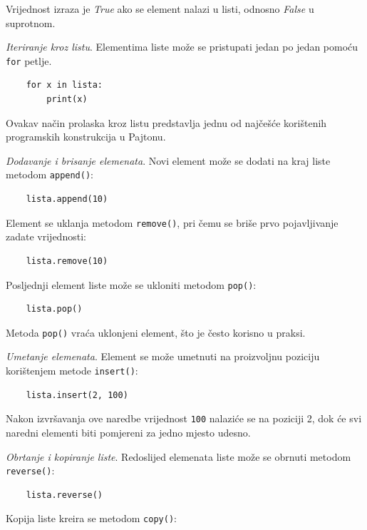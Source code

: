 Vrijednost izraza je \emph{True} ako se element nalazi u listi, odnosno \emph{False} u suprotnom.

\textit{Iteriranje kroz listu}. Elementima liste može se pristupati jedan po jedan pomoću \texttt{for} petlje.

\begin{verbatim}
	for x in lista:
	    print(x)
\end{verbatim}

Ovakav način prolaska kroz listu predstavlja jednu od najčešće korištenih programskih konstrukcija u Pajtonu.

\textit{Dodavanje i brisanje elemenata}. Novi element može se dodati na kraj liste metodom \texttt{append()}:

\begin{verbatim}
	lista.append(10)
\end{verbatim}

Element se uklanja metodom \texttt{remove()}, pri čemu se briše prvo pojavljivanje zadate vrijednosti:

\begin{verbatim}
	lista.remove(10)
\end{verbatim}

Posljednji element liste može se ukloniti metodom \texttt{pop()}:

\begin{verbatim}
	lista.pop()
\end{verbatim}

Metoda \texttt{pop()} vraća uklonjeni element, što je često korisno u praksi.

\textit{Umetanje elemenata}.  Element se može umetnuti na proizvoljnu poziciju korištenjem metode \texttt{insert()}:

\begin{verbatim}
	lista.insert(2, 100)
\end{verbatim}

Nakon izvršavanja ove naredbe vrijednost \texttt{100} nalaziće se na poziciji 2, dok će svi naredni elementi biti pomjereni za jedno mjesto udesno.

\textit{Obrtanje i kopiranje liste}. Redoslijed elemenata liste može se obrnuti metodom \texttt{reverse()}:

\begin{verbatim}
	lista.reverse()
\end{verbatim}

Kopija liste kreira se metodom \texttt{copy()}:

